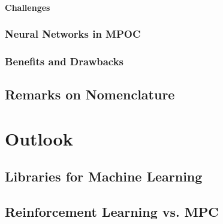             \subsubsection{Challenges} %

        \subsection{Neural Networks in MPOC} %

        \subsection{Benefits and Drawbacks} %

    \section{Remarks on Nomenclature} %

\chapter{Outlook} %

    \section{Libraries for Machine Learning} %

    \section{Reinforcement Learning vs. MPC} %
